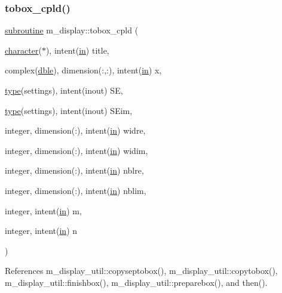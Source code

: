 \subsubsection{\texorpdfstring{tobox\+\_\+cpld()}{tobox\_cpld()}}
{\footnotesize\ttfamily \hyperlink{M__stopwatch_83_8txt_acfbcff50169d691ff02d4a123ed70482}{subroutine} m\+\_\+display\+::tobox\+\_\+cpld (\begin{DoxyParamCaption}\item[{\hyperlink{option__stopwatch_83_8txt_abd4b21fbbd175834027b5224bfe97e66}{character}($\ast$), intent(\hyperlink{M__journal_83_8txt_afce72651d1eed785a2132bee863b2f38}{in})}]{title,  }\item[{complex(\hyperlink{namespacem__display_a46d90b75b6ccef7ccade133e5847e815}{dble}), dimension(\+:,\+:), intent(\hyperlink{M__journal_83_8txt_afce72651d1eed785a2132bee863b2f38}{in})}]{x,  }\item[{\hyperlink{stop__watch_83_8txt_a70f0ead91c32e25323c03265aa302c1c}{type}(settings), intent(inout)}]{SE,  }\item[{\hyperlink{stop__watch_83_8txt_a70f0ead91c32e25323c03265aa302c1c}{type}(settings), intent(inout)}]{S\+Eim,  }\item[{integer, dimension(\+:), intent(\hyperlink{M__journal_83_8txt_afce72651d1eed785a2132bee863b2f38}{in})}]{widre,  }\item[{integer, dimension(\+:), intent(\hyperlink{M__journal_83_8txt_afce72651d1eed785a2132bee863b2f38}{in})}]{widim,  }\item[{integer, dimension(\+:), intent(\hyperlink{M__journal_83_8txt_afce72651d1eed785a2132bee863b2f38}{in})}]{nblre,  }\item[{integer, dimension(\+:), intent(\hyperlink{M__journal_83_8txt_afce72651d1eed785a2132bee863b2f38}{in})}]{nblim,  }\item[{integer, intent(\hyperlink{M__journal_83_8txt_afce72651d1eed785a2132bee863b2f38}{in})}]{m,  }\item[{integer, intent(\hyperlink{M__journal_83_8txt_afce72651d1eed785a2132bee863b2f38}{in})}]{n }\end{DoxyParamCaption})\hspace{0.3cm}{\ttfamily [private]}}



References m\+\_\+display\+\_\+util\+::copyseptobox(), m\+\_\+display\+\_\+util\+::copytobox(), m\+\_\+display\+\_\+util\+::finishbox(), m\+\_\+display\+\_\+util\+::preparebox(), and then().

